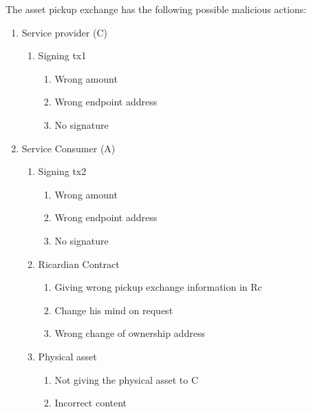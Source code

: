 The asset pickup exchange has the following possible malicious actions:
\begin{enumerate}
  \item Service provider (C)
  \begin{enumerate}
    \item Signing tx1
    \begin{enumerate}
      \item Wrong amount
      \item Wrong endpoint address
      \item No signature
    \end{enumerate}
  \end{enumerate}
  \item Service Consumer (A)
  \begin{enumerate}
    \item Signing tx2
    \begin{enumerate}
      \item Wrong amount
      \item Wrong endpoint address
      \item No signature
    \end{enumerate}
    \item Ricardian Contract
    \begin{enumerate}
      \item Giving wrong pickup exchange information in Rc
      \item Change his mind on request
      \item Wrong change of ownership address
    \end{enumerate}
    \item Physical asset
    \begin{enumerate}
      \item Not giving the physical asset to C
      \item Incorrect content
    \end{enumerate}
  \end{enumerate}
\end{enumerate}


